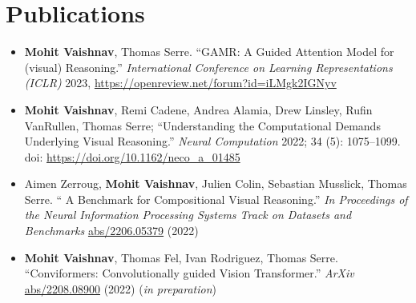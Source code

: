 \chapter{Publications}
\startcontents[chapters]
\begin{itemize}

    \item \textbf{Mohit Vaishnav}, Thomas Serre. ``GAMR: A Guided Attention Model for (visual) Reasoning.'' \textit{International Conference on Learning Representations (ICLR)} 2023,  \href{https://openreview.net/forum?id=iLMgk2IGNyv}{https://openreview.net/forum?id=iLMgk2IGNyv}  
    
    
    \item \textbf{Mohit Vaishnav}, Remi Cadene, Andrea Alamia, Drew Linsley, Rufin VanRullen, Thomas Serre; ``Understanding the Computational Demands Underlying Visual Reasoning.'' \textit{Neural Computation} 2022; 34 (5): 1075–1099. doi: \url{https://doi.org/10.1162/neco_a_01485}
    
    \item Aimen Zerroug, \textbf{Mohit Vaishnav}, Julien Colin, Sebastian Musslick, Thomas Serre. `` A Benchmark for Compositional Visual Reasoning.'' \textit{In Proceedings of the Neural Information Processing Systems Track on Datasets and Benchmarks} \url{abs/2206.05379} (2022)
    
    \item \textbf{Mohit Vaishnav}, Thomas Fel, Ivan Rodriguez, Thomas Serre. ``Conviformers: Convolutionally guided Vision Transformer.'' \textit{ArXiv} \url{abs/2208.08900} (2022) (\textit{in preparation})
    
    
\end{itemize}

